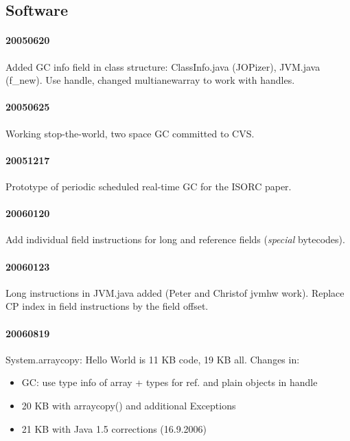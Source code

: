 \documentclass[a4paper,12pt]{scrartcl}
\begin{document}
\subsection{Software}

\paragraph{20050620}

Added GC info field in class structure: ClassInfo.java (JOPizer),
JVM.java (f\_new). Use handle, changed multianewarray to work with
handles.

\paragraph{20050625}

Working stop-the-world, two space GC committed to CVS.

\paragraph{20051217}

Prototype of periodic scheduled real-time GC for the ISORC paper.

\paragraph{20060120}

Add individual field instructions for long and reference fields
(\emph{special} bytecodes).

\paragraph{20060123}

Long instructions in JVM.java added (Peter and Christof jvmhw work).
Replace CP index in field instructions by the field offset.

\paragraph{20060819}

System.arraycopy: Hello World is 11 KB code, 19 KB all. Changes in:
\begin{itemize}
    \item GC: use type info of array + types for ref. and plain
        objects in handle
    \item 20 KB with arraycopy() and additional Exceptions
    \item 21 KB with Java 1.5 corrections (16.9.2006)
\end{itemize}
\end{document}
